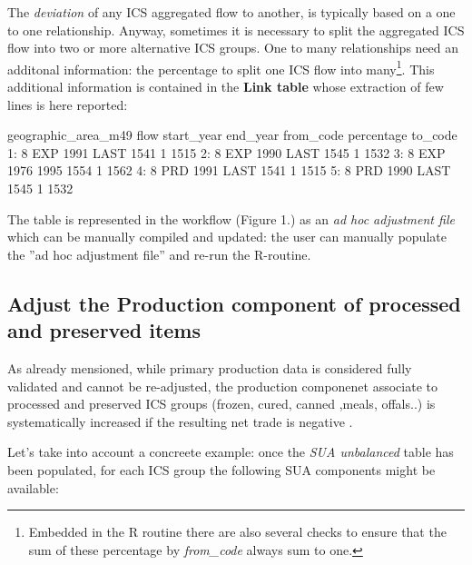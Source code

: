 \documentclass[nojss]{jss}
\begin{document}
The \textit{deviation} of any ICS aggregated flow to another, is typically based on a one to one relationship. Anyway, sometimes it is necessary to split the aggregated ICS flow into two or more alternative ICS groups. One to many relationships need an additonal information: the percentage to split one ICS flow into many\footnote{Embedded in the R routine there are also several checks to ensure that the sum of these percentage by \textit{from_code} always sum to one. }.  This additional information is contained in the \textbf{Link table} whose extraction of few lines is here reported:


\begin{Schunk}
\begin{Soutput}
   geographic_area_m49 flow start_year end_year from_code percentage to_code
1:                   8  EXP       1991     LAST      1541          1    1515
2:                   8  EXP       1990     LAST      1545          1    1532
3:                   8  EXP       1976     1995      1554          1    1562
4:                   8  PRD       1991     LAST      1541          1    1515
5:                   8  PRD       1990     LAST      1545          1    1532
\end{Soutput}
\end{Schunk}



The  table is represented in the workflow (Figure 1.) as an \textit{ad hoc adjustment file} which can be manually compiled and updated: the user can manually populate the ''ad hoc adjustment file'' and re-run the R-routine. 


\subsection{Adjust the Production component of processed and preserved items}

As already mensioned, while primary production data is considered fully validated and cannot be re-adjusted, the production componenet associate to processed and preserved ICS groups (frozen, cured, canned ,meals, offals..) is systematically increased if the resulting net trade is negative .

Let's take into account a concreete example: once the \textit{SUA unbalanced} table has been populated, for each ICS group the following SUA components might be available:
\end{document}
